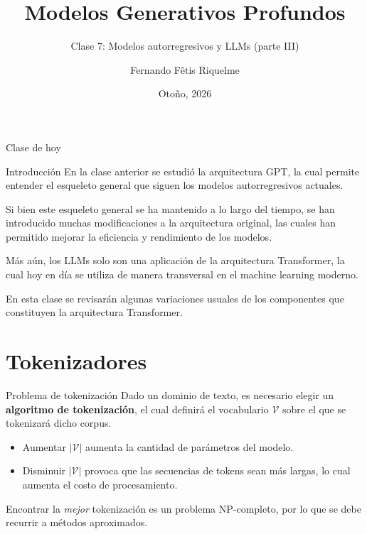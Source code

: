 \documentclass{beamer}
\title{Modelos Generativos Profundos}
\subtitle{Clase 7: Modelos autorregresivos y LLMs (parte III)}
\author{Fernando Fêtis Riquelme}
\institute{
    Facultad de Ciencias Físicas y Matemáticas\\
    Universidad de Chile
}
\date{Otoño, 2026}
\begin{document}
\begin{frame}
    \titlepage
\end{frame}

\begin{frame}{Clase de hoy}
    \tableofcontents
\end{frame}

\begin{frame}{Introducción}
    En la clase anterior se estudió la arquitectura GPT, la cual permite entender el esqueleto general que siguen los modelos autorregresivos actuales.

    Si bien este esqueleto general se ha mantenido a lo largo del tiempo, se han introducido muchas modificaciones a la arquitectura original, las cuales han permitido mejorar la eficiencia y rendimiento de los modelos.

    Más aún, los LLMs solo son una aplicación de la arquitectura Transformer, la cual hoy en día se utiliza de manera transversal en el machine learning moderno.

    En esta clase se revisarán algunas variaciones usuales de los componentes que constituyen la arquitectura Transformer.
\end{frame}

\section{Tokenizadores}

\begin{frame}{Problema de tokenización}
    Dado un dominio de texto, es necesario elegir un \textbf{algoritmo de tokenización}, el cual definirá el vocabulario $\mathcal{V}$ sobre el que se tokenizará dicho corpus.
    \begin{itemize}
        \item Aumentar $|\mathcal{V}|$ aumenta la cantidad de parámetros del modelo.
        \item Disminuir $|\mathcal{V}|$ provoca que las secuencias de tokens sean más largas, lo cual aumenta el costo de procesamiento.
    \end{itemize}
    Encontrar la \textit{mejor} tokenización es un problema NP-completo, por lo que se debe recurrir a métodos aproximados.
\end{frame}
\end{document}

